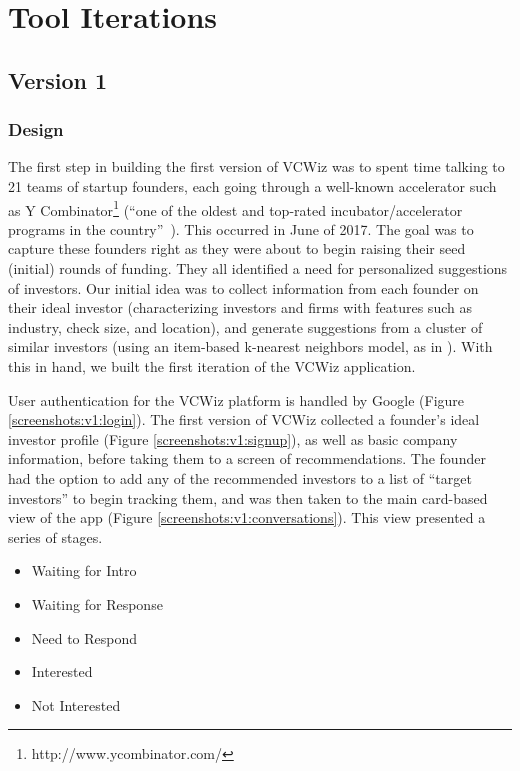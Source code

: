 \section{Tool Iterations}

\subsection{Version 1}

\subsubsection{Design}

The first step in building the first version of VCWiz was to spent time talking to 21 teams of startup founders, each going through a well-known accelerator such as Y Combinator\footnote{http://www.ycombinator.com/} (``one of the oldest and top-rated incubator/accelerator programs in the country''~\cite{stross2013launch}). This occurred in June of 2017. The goal was to capture these founders right as they were about to begin raising their seed (initial) rounds of funding. They all identified a need for personalized suggestions of investors. Our initial idea was to collect information from each founder on their ideal investor (characterizing investors and firms with features such as industry, check size, and location), and generate suggestions from a cluster of similar investors (using an item-based k-nearest neighbors model, as in \cite{Stone:2013:EST:2541167.2507882}). With this in hand, we built the first iteration of the VCWiz application.

User authentication for the VCWiz platform is handled by Google (Figure \ref{screenshots:v1:login}). The first version of VCWiz collected a founder's ideal investor profile (Figure \ref{screenshots:v1:signup}), as well as basic company information, before taking them to a screen of recommendations. The founder had the option to add any of the recommended investors to a list of ``target investors'' to begin tracking them, and was then taken to the main card-based view of the app (Figure \ref{screenshots:v1:conversations}). This view presented a series of stages.

\begin{itemize}
  \item Waiting for Intro
  \item Waiting for Response
  \item Need to Respond
  \item Interested
  \item Not Interested
\end{itemize}

